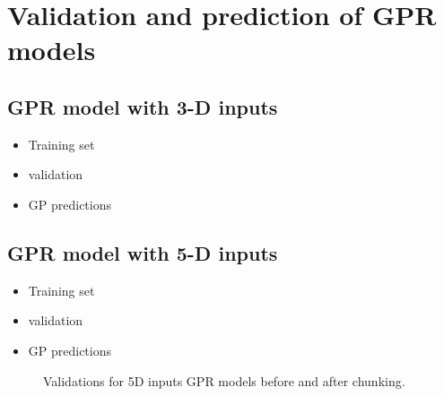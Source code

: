 \section{Validation and prediction of GPR models }

\subsection{GPR model with 3-D inputs}
\begin{itemize}
\item Training set 
\item validation 
\item GP predictions
\end{itemize}



\subsection{GPR model with 5-D inputs}
\begin{itemize}
\item Training set 
\item validation 
\item GP predictions
\end{itemize}
\begin{figure}
    \caption{Validations for 5D inputs GPR models before and after chunking.}
    \label{fig:4d_vali1}
\end{figure}



